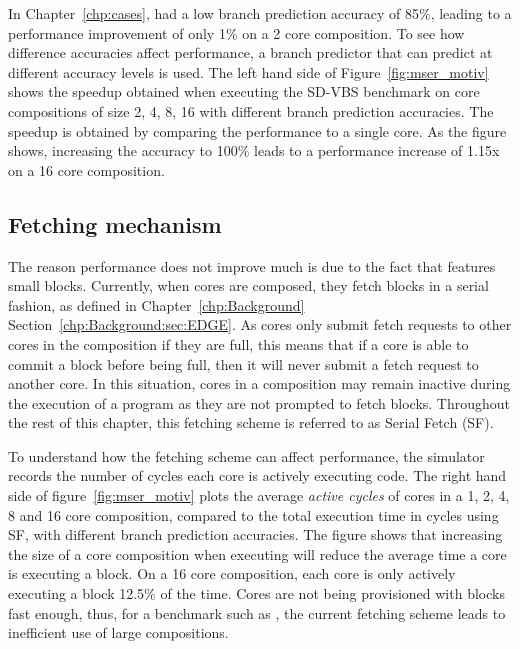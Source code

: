 In Chapter~\ref{chp:cases},  had a low branch prediction accuracy of 85\%, leading to a performance improvement of only 1\% on a 2 core composition.
To see how difference accuracies affect performance, a branch predictor that can predict at different accuracy levels is used.
The left hand side of Figure~\ref{fig:mser_motiv} shows the speedup obtained when executing the SD-VBS benchmark  on core compositions of size 2, 4, 8, 16 with different branch prediction accuracies.
The speedup is obtained by comparing the performance to a single core.
As the figure shows, increasing the accuracy to 100\% leads to a performance increase of 1.15x on a 16 core composition.


\subsection{Fetching mechanism}
The reason performance does not improve much is due to the fact that  features small blocks.
Currently, when cores are composed, they fetch blocks in a serial fashion, as defined in Chapter~\ref{chp:Background} Section~\ref{chp:Background:sec:EDGE}.
As cores only submit fetch requests to other cores in the composition if they are full, this means that if a core is able to commit a block before being full, then it will never submit a fetch request to another core.
In this situation, cores in a composition may remain inactive during the execution of a program as they are not prompted to fetch blocks.
Throughout the rest of this chapter, this fetching scheme is referred to as Serial Fetch (SF).%

To understand how the fetching scheme can affect performance, the simulator records the number of cycles each core is actively executing code.
The right hand side of figure~\ref{fig:mser_motiv} plots the average \textit{active cycles} of cores in a 1, 2, 4, 8 and 16 core composition, compared to the total execution time in cycles using SF, with different branch prediction accuracies.
The figure shows that increasing the size of a core composition when executing  will reduce the average time a core is executing a block.
On a 16 core composition, each core is only actively executing a block 12.5\% of the time.
Cores are not being provisioned with blocks fast enough, thus, for a benchmark such as , the current fetching scheme leads to inefficient use of large compositions.

